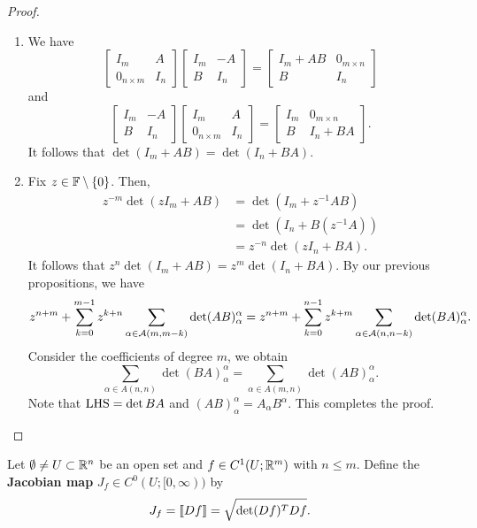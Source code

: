 \documentclass[a4paper]{article}
\begin{document}
\begin{proof}
\begin{enumerate}
\item We have 
\[
\begin{bmatrix}
  I_m & A \\
  0_{n \times m} & I_n
\end{bmatrix} 
\begin{bmatrix}
  I_m & - A \\ 
  B & I_n
\end{bmatrix}
= \begin{bmatrix}
  I_m + AB & 0_{m \times n} \\
  B & I_n
\end{bmatrix}
\]
and 
\[
\begin{bmatrix}
  I_m & -A \\
  B & I_n
\end{bmatrix}
\begin{bmatrix}
  I_m & A \\  
  0_{n \times m} & I_n 
\end{bmatrix}
= \begin{bmatrix}
  I_m & 0_{m \times n} \\
  B & I_n + BA
\end{bmatrix}.
\]
It follows that $\det(I_m + AB) = \det(I_n + BA)$.

\item Fix $z \in \mathbb{F} \setminus \left\{ 0 \right\}$. 
Then, 
\[
\begin{aligned}
  z^{-m} \det(z I_m + AB) 
  &= \det(I_m + z^{-1} AB)  \\
  &= \det(I_n + B (z^{-1} A)) \\
  &= z^{-n} \det(z I_n + BA).
\end{aligned}
\]
It follows that $z^n \det(I_m + AB) = 
z^m \det(I_n + BA)$. By our previous propositions, 
we have 
\[
z^{n+m} + \sum_{k=0}^{m-1} 
z^{k+n} \sum_{\alpha \in \mathcal{A}(m, m-k)} \det(AB)_\alpha^\alpha 
= z^{n + m} + \sum_{k=0}^{n-1} z^{k+m} 
\sum_{\alpha \in \mathcal{A}(n, n - k)} \det (BA)_\alpha^\alpha.
\]
Consider the coefficients of degree $m$, we obtain 
\[
\sum_{\alpha \in A(n, n)} \det(BA)_\alpha^\alpha 
= \sum_{\alpha \in A(m, n)} \det(AB)_\alpha^\alpha.
\]
Note that $\operatorname{LHS} = \det BA$ and $(AB)_\alpha^\alpha = 
A_\alpha B^\alpha$. This completes the proof.
\end{enumerate}
\end{proof}

\begin{defi}
Let $\emptyset \neq U \subset \mathbb{R}^n$ be an open set and 
$f \in C^1 (U; \mathbb{R}^m)$ with $n \leq m$. Define the 
\textbf{Jacobian map} $J_f \in C^0 (U; [0, \infty))$
by 
\[
J_f = \left\llbracket Df \right\rrbracket = \sqrt{\det (Df)^T Df}.
\]
\end{defi}
\end{document}

